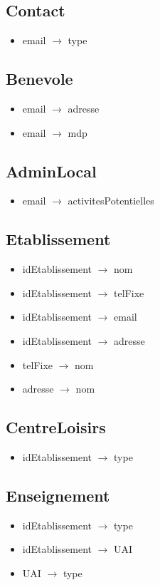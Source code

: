 \documentclass[asi, sansVersion]{picInsa}
\begin{document}
\subsection*{Contact}
\begin{itemize}
\item[] email $\rightarrow$ type 
\end{itemize}

\subsection*{Benevole}
\begin{itemize}
\item[] email $\rightarrow$ adresse 
\item[] email $\rightarrow$ mdp 
\end{itemize}


\subsection*{AdminLocal}
\begin{itemize}
\item[]email $\rightarrow$ activitesPotentielles 
\end{itemize}

\subsection*{Etablissement}
\begin{itemize}
\item[] idEtablissement $\rightarrow$ nom 
\item[] idEtablissement $\rightarrow$ telFixe
\item[] idEtablissement $\rightarrow$ email
\item[] idEtablissement $\rightarrow$ adresse
\item[] telFixe $\rightarrow$ nom
\item[] adresse $\rightarrow$ nom
\end{itemize}

\subsection*{CentreLoisirs}
\begin{itemize}
\item[]	idEtablissement $\rightarrow$ type
\end{itemize}

\subsection*{Enseignement}
\begin{itemize}
\item[]	idEtablissement $\rightarrow$ type
\item[] idEtablissement $\rightarrow$ UAI
\item[] UAI $\rightarrow$ type
\end{itemize}
\end{document}
